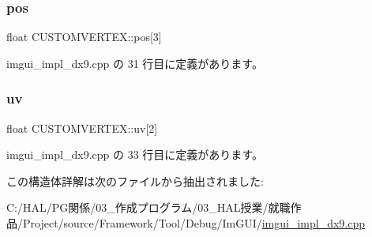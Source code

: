 \subsubsection{\texorpdfstring{pos}{pos}}
{\footnotesize\ttfamily float C\+U\+S\+T\+O\+M\+V\+E\+R\+T\+E\+X\+::pos\mbox{[}3\mbox{]}}



 imgui\+\_\+impl\+\_\+dx9.\+cpp の 31 行目に定義があります。

\mbox{\label{struct_c_u_s_t_o_m_v_e_r_t_e_x_a2c27e901db37bc828fb408010596304c}} 
\subsubsection{\texorpdfstring{uv}{uv}}
{\footnotesize\ttfamily float C\+U\+S\+T\+O\+M\+V\+E\+R\+T\+E\+X\+::uv\mbox{[}2\mbox{]}}



 imgui\+\_\+impl\+\_\+dx9.\+cpp の 33 行目に定義があります。



この構造体詳解は次のファイルから抽出されました\+:\begin{DoxyCompactItemize}
\item 
C\+:/\+H\+A\+L/\+P\+G関係/03\+\_\+作成プログラム/03\+\_\+\+H\+A\+L授業/就職作品/\+Project/source/\+Framework/\+Tool/\+Debug/\+Im\+G\+U\+I/\mbox{\hyperlink{imgui__impl__dx9_8cpp}{imgui\+\_\+impl\+\_\+dx9.\+cpp}}\end{DoxyCompactItemize}
